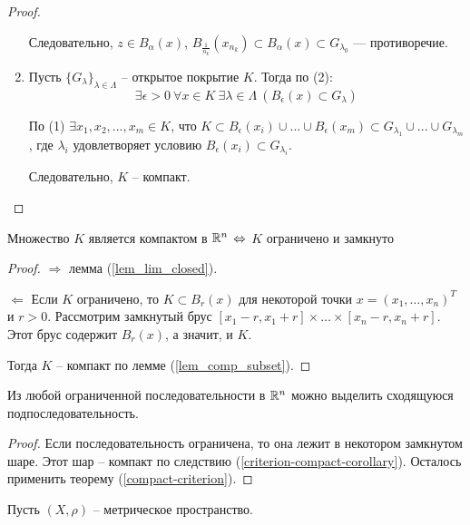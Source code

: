 \begin{theorem}
\begin{proof}
\begin{enumerate}
            Следовательно, $z \in B_\alpha(x)$, $B_{\frac{1}{n_k}}(x_{n_k}) \subset B_\alpha(x) \subset G_{\lambda_0}$ --- противоречие.
    
            \item Пусть $\{G_{\lambda}\}_{\lambda \in \Lambda}$ -- открытое покрытие $K$. Тогда по (2):
            \[\exists \epsilon > 0 \ \forall x \in K \ \exists \lambda \in \Lambda \ (B_{\epsilon}(x) \subset G_{\lambda})\]
    
            По (1) $\exists x_{1}, x_{2}, ..., x_{m} \in K$, что $K \subset B_{\epsilon}(x_{i}) \cup ... \cup B_{\epsilon}(x_{m}) \subset G_{\lambda_{1}} \cup ... \cup G_{\lambda_{m}}$, где $\lambda_{i}$ удовлетворяет условию $B_{\epsilon}(x_{i}) \subset G_{\lambda_{i}}$.
    
            Следовательно, $K$ -- компакт.
        \end{enumerate}
    \end{proof}
\end{theorem}

\begin{corollary}
    \label{criterion-compact-corollary}
    Множество $K$ является компактом в $\mathbb{R}^{n}$ $\Leftrightarrow$ $K$ ограничено и замкнуто
\end{corollary}

\begin{proof}
    $\Rightarrow$ лемма (\ref{lem_lim_closed}).

    $\Leftarrow$ Если $K$ ограничено, то $K \subset B_{r}(x)$ для некоторой точки $x = (x_{1}, \ldots, x_{n})^{T}$ и $r > 0$. Рассмотрим замкнутый брус $[x_{1} - r, x_{1} + r] \times \ldots \times [x_{n} - r, x_{n} + r]$. Этот брус содержит $B_{r}(x)$, а значит, и $K$.

    Тогда $K$ -- компакт по лемме (\ref{lem_comp_subset}).
\end{proof}

\begin{corollary}
    Из любой ограниченной последовательности в $\mathbb{R}^{n}$ можно выделить сходящуюся подпоследовательность.
\end{corollary}

\begin{proof}
    Если последовательность ограничена, то она лежит в некотором замкнутом шаре. Этот шар -- компакт по следствию (\ref{criterion-compact-corollary}). Осталось применить теорему (\ref{compact-criterion}).
\end{proof}

Пусть $(X, \rho)$ -- метрическое пространство.

